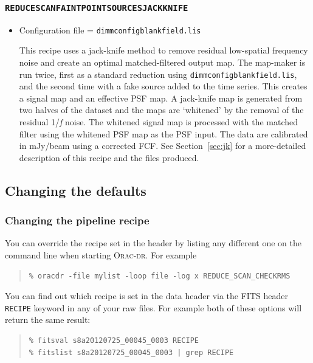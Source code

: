 \documentclass[twoside,11pt]{article}
\newcommand{\htmladdnormallink}[2]{#1}
\newcommand{\htmlref}[2]{#1}
\newcommand{\latexhtml}[2]{#1}
\newcommand{\xlabel}[1]{}
\renewcommand{\_}{\texttt{\symbol{95}}}
\newenvironment{myquote}{
   \color{MidnightBlue}\begin{quote}\begin{small}}{
   \end{small}\end{quote}
}
\newcommand{\oracdr}{\htmladdnormallink{\textsc{Orac-dr}}{http://www.oracdr.org/oracdr}}
\newcommand{\drrecipe}[1]{\texttt{#1}}
\newcommand{\file}[1]{\texttt{#1}}
\newcommand{\cref}[3]{\latexhtml{#1~\ref{#2}}{\htmlref{#3}{#2}}}
\renewenvironment{myquote}{
      \begin{quote}\begin{small}}{
      \end{small}\end{quote}
   }
\begin{document}
\subsubsection{\xlabel{faintjk}\drrecipe{REDUCE\_SCAN\_FAINT\_POINT\_SOURCES\_JACKKNIFE}}
\begin{itemize}
\item Configuration file = \file{dimmconfig\_blank\_field.lis}

This recipe uses a
\htmladdnormallink{jack-knife}{http://en.wikipedia.org/wiki/Jackknife_resampling}
method to remove residual low-spatial
frequency noise and create an optimal matched-filtered output map. The
map-maker is run twice, first as a standard reduction using
\file{dimmconfig\_blank\_field.lis}, and the second time with a fake
source added to the time series. This creates a signal map and an
effective PSF map. A jack-knife map is generated from two halves of
the dataset and the maps are `whitened' by the removal of the residual
1/\emph{f} noise. The whitened signal map is processed with the
matched filter using the whitened PSF map as the PSF input. The data
are calibrated in mJy/beam using a corrected FCF.
See \cref{Section}{sec:jk}{Example 2 -- Advanced pipeline method} for a
more-detailed description of this recipe and the files produced.
\end{itemize}

\subsection{Changing the defaults}
\label{sec:parameterfile}
\subsubsection{Changing the pipeline recipe}
You can override the recipe set in the header by listing any different
one on the command line when starting \oracdr. For example
\begin{myquote}
\begin{verbatim}
% oracdr -file mylist -loop file -log x REDUCE_SCAN_CHECKRMS
\end{verbatim}
\end{myquote}

You can find out which recipe is set in the data header via the FITS
header \texttt{RECIPE} keyword in any of your raw files.  For
example both of these options will return the same result:
\begin{myquote}
\begin{verbatim}
% fitsval s8a20120725_00045_0003 RECIPE
% fitslist s8a20120725_00045_0003 | grep RECIPE
\end{verbatim}
\end{myquote}
\end{document}
